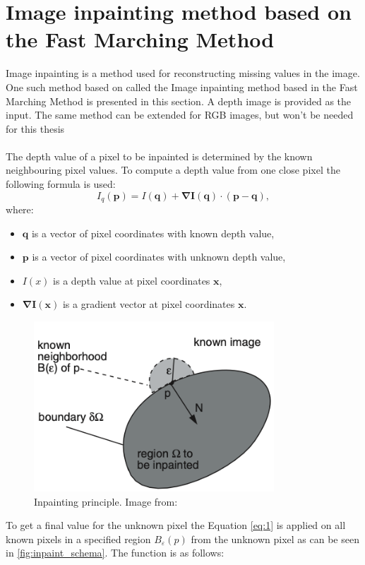 \documentclass[twoside]{ctuthesis}
\theoremstyle{plain}
\theoremstyle{definition}
\theoremstyle{note}
\begin{document}
\section{Image inpainting method based on the Fast Marching Method} \label{inpainting}
Image inpainting is a method used for reconstructing missing values in the image. One such method based on \cite{cite:5} called the Image inpainting method based in the Fast Marching Method is presented in this section. A depth image is provided as the input. The same method can be extended for RGB images, but won't be needed for this thesis\\
\\
The depth value of a pixel to be inpainted is determined by the known neighbouring pixel values. To compute a depth value from one close pixel the following formula is used:
\begin{equation} \label{eq:1}
	I_q(\mathbf{p})=I(\mathbf{q})+\mathbf{\nabla I(q)}\cdot(\mathbf{p}-\mathbf{q}),
\end{equation}
where:
\begin{itemize}
	\item $\mathbf{q}$ is a vector of pixel coordinates with known depth value,
	\item $\mathbf{p}$ is a vector of pixel coordinates with unknown depth value,
	\item $I(x)$ is a depth value at pixel coordinates $\mathbf{x}$,
	\item $\mathbf{\nabla I(x)}$ is a gradient vector at pixel coordinates $\mathbf{x}$.
\end{itemize}
\begin{figure}[h]
	\centering
	\includegraphics[width=9cm]{inpaint_principle.png}
	\caption{Inpainting principle. Image from: \cite{cite:5}}
	\label{fig:inpaint_schema}
\end{figure}
To get a final value for the unknown pixel the Equation \ref{eq:1} is applied on all known pixels in a specified region $B_{\varepsilon}(p)$ from the unknown pixel as can be seen in  \autoref{fig:inpaint_schema}. The function is as follows:
\end{document}
